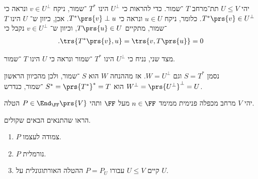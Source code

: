 \documentclass[a4paper,10pt,twoside,openany]{book}
\begin{document}
\begin{solution}
יהי
$U \leq V$
תת־מרחב
$T$%
־שמור. כדי להראות כי
$U^\perp$
הינו
$T^*$%
־שמור, ניקח
$v \in U^\perp$
ונראה כי
$T^*\prs{v} \in U^\perp$.
כלומר, ניקח
$u \in U$
ונראה כי
$T^*\prs{v} \perp u$.
אכן, כיוון ש־%
$U$
הינו
$T$%
־שמור, מתקיים
$T\prs{u} \in U$,
וכיוון ש־%
$v \in U^\perp$
נקבל כי
\begin{align*}
\text{.} \trs{T^*\prs{v}, u} = \trs{v, T\prs{u}} = 0
\end{align*}

מצד שני, נניח כי
$U^\perp$
הינו
$T^*$%
־שמור ונראה כי
$U$
הינו
$T$%
־שמור.

נסמן
$S = T^*$
וגם
$W = U^\perp$.
אז מההנחה
$W$
הוא
$S$%
־שמור, ולכן מהכיוון הראשון
$W^\perp = \prs{U^\perp}^\perp = U$
הוא
$S^* = \prs{T^*}^* = T$%
־שמור, כנדרש.
\end{solution}

\begin{exercisechap}
יהי
$V$
מרחב מכפלה פנימית ממימד
$n \in \FF$
מעל
$\FF$
ותהי
$P \in \End_\FF\prs{V}$
הטלה.

הראו שהתנאים הבאים שקולים.

\begin{enumerate}
\item $P$ צמודה לעצמו.
\item $P$ נורמלית.
\item קיים
$U \leq V$
עבורו
$P = P_U$
ההטלה האורתוגונלית על
$U$.
\end{enumerate}
\end{exercisechap}
\end{document}
